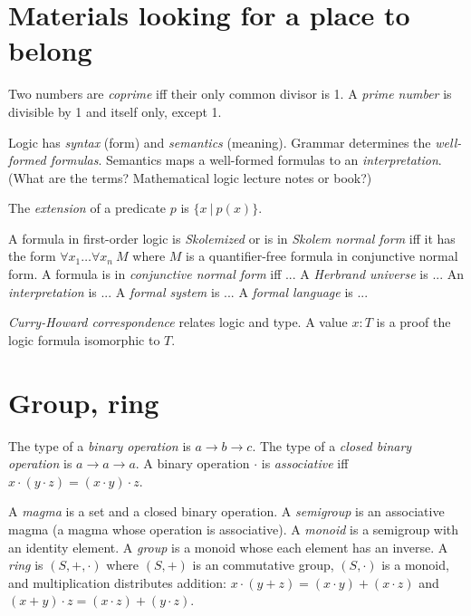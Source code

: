 \section{Materials looking for a place to belong}

%
%
Two numbers are \emph{coprime} iff their only common divisor is 1.
%
%
A \emph{prime number} is divisible by 1 and itself only, except 1.

Logic has \emph{syntax} (form) and \emph{semantics} (meaning).
Grammar determines the \emph{well-formed formulas}.
Semantics maps a well-formed formulas to an \emph{interpretation}.
(What are the terms? Mathematical logic lecture notes or book?)

%
The \emph{extension} of a predicate \(p\) is \(\{x~|~p(x)\}\).

%
%
%
%
A formula in first-order logic is \emph{Skolemized} or is in \emph{Skolem normal form}
iff it has the form \(\forall x_1 \ldots \forall x_n ~ M\)
where \(M\) is a quantifier-free formula in conjunctive normal form.
A formula is in \emph{conjunctive normal form} iff ...
%
A \emph{Herbrand universe} is ...
%
An \emph{interpretation} is ...
A \emph{formal system} is ...
A \emph{formal language} is ...

%
\emph{Curry-Howard correspondence} relates logic and type.
A value \(x : T\) is a proof the logic formula isomorphic to \(T\).

\section{Group, ring}

%
The type of a \emph{binary operation} is \(a \to b \to c\).
%
%
The type of a \emph{closed binary operation} is \(a \to a \to a\).
A binary operation \(\cdot\) is \emph{associative} iff \(x\cdot(y\cdot z) = (x\cdot y)\cdot z\).

%
A \emph{magma} is a set and a closed binary operation.
%
A \emph{semigroup} is an associative magma (a magma whose operation is associative).
%
A \emph{monoid} is a semigroup with an identity element.
%
A \emph{group} is a monoid whose each element has an inverse.
A \emph{ring} is \((S,+,\cdot)\) where
\((S,+)\) is an commutative group,
\((S,\cdot)\) is a monoid,
and multiplication distributes addition:
\(x \cdot (y+z) = (x \cdot y) + (x \cdot z)\)
and \((x+y) \cdot z = (x \cdot z) + (y \cdot z)\).

